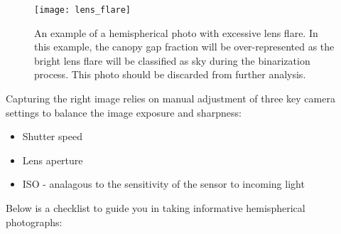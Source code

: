 \documentclass{article}
\begin{document}
\begin{figure}[H]
\centering
	\texttt{[image: lens\_flare]}
	\caption{An example of a hemispherical photo with excessive lens flare. In this example, the canopy gap fraction will be over-represented as the bright lens flare will be classified as sky during the binarization process. This photo should be discarded from further analysis.}
	\label{lens_flare}
\end{figure}

Capturing the right image relies on manual adjustment of three key camera settings to balance the image exposure and sharpness:

\begin{itemize}
	\item{Shutter speed}
	\item{Lens aperture}
	\item{ISO - analagous to the sensitivity of the sensor to incoming light}
\end{itemize}

Below is a checklist to guide you in taking informative hemispherical photographs: 
\end{document}
